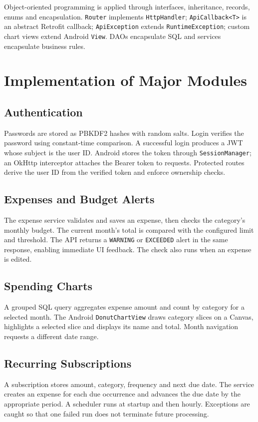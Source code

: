 \documentclass[12pt,a4paper]{report}
\begin{document}
Object-oriented programming is applied through interfaces, inheritance, records, enums and encapsulation. \texttt{Router} implements \texttt{HttpHandler}; \texttt{ApiCallback<T>} is an abstract Retrofit callback; \texttt{ApiException} extends \texttt{RuntimeException}; custom chart views extend Android \texttt{View}. DAOs encapsulate SQL and services encapsulate business rules.

\section{Implementation of Major Modules}
\subsection{Authentication}
Passwords are stored as PBKDF2 hashes with random salts. Login verifies the password using constant-time comparison. A successful login produces a JWT whose subject is the user ID. Android stores the token through \texttt{SessionManager}; an OkHttp interceptor attaches the Bearer token to requests. Protected routes derive the user ID from the verified token and enforce ownership checks.

\subsection{Expenses and Budget Alerts}
The expense service validates and saves an expense, then checks the category's monthly budget. The current month's total is compared with the configured limit and threshold. The API returns a \texttt{WARNING} or \texttt{EXCEEDED} alert in the same response, enabling immediate UI feedback. The check also runs when an expense is edited.

\subsection{Spending Charts}
A grouped SQL query aggregates expense amount and count by category for a selected month. The Android \texttt{DonutChartView} draws category slices on a Canvas, highlights a selected slice and displays its name and total. Month navigation requests a different date range.

\subsection{Recurring Subscriptions}
A subscription stores amount, category, frequency and next due date. The service creates an expense for each due occurrence and advances the due date by the appropriate period. A scheduler runs at startup and then hourly. Exceptions are caught so that one failed run does not terminate future processing.
\end{document}
